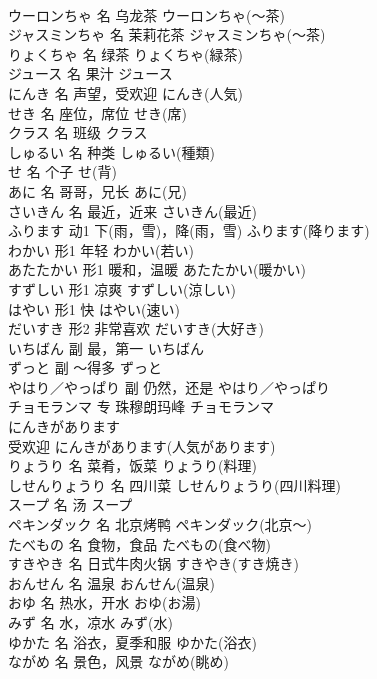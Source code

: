 \documentclass[8pt]{extreport}
\begin{document}
\begin{CJK}{UTF8}{min}
\\	ウーロンちゃ	名	乌龙茶	ウーロンちゃ(～茶)	
\\	ジャスミンちゃ	名	茉莉花茶	ジャスミンちゃ(～茶)	
\\	りょくちゃ	名	绿茶	りょくちゃ(緑茶)	
\\	ジュース	名	果汁	ジュース	
\\	にんき	名	声望，受欢迎	にんき(人気)	
\\	せき	名	座位，席位	せき(席)	
\\	クラス	名	班级	クラス	
\\	しゅるい	名	种类	しゅるい(種類)	
\\	せ	名	个子	せ(背)	
\\	あに	名	哥哥，兄长	あに(兄)	
\\	さいきん	名	最近，近来	さいきん(最近)	
\\	ふります	动1	下(雨，雪)，降(雨，雪)	ふります(降ります)	
\\	わかい	形1	年轻	わかい(若い)	
\\	あたたかい	形1	暖和，温暖	あたたかい(暖かい)	
\\	すずしい	形1	凉爽	すずしい(涼しい)	
\\	はやい	形1	快	はやい(速い)	
\\	だいすき	形2	非常喜欢	だいすき(大好き)	
\\	いちばん	副	最，第一	いちばん	
\\	ずっと	副	～得多	ずっと	
\\	やはり／やっぱり	副	仍然，还是	やはり／やっぱり	
\\	チョモランマ	专	珠穆朗玛峰	チョモランマ	
\\	にんきがあります	
\\	受欢迎	にんきがあります(人気があります)	
\\	りょうり	名	菜肴，饭菜	りょうり(料理)	
\\	しせんりょうり	名	四川菜	しせんりょうり(四川料理)	
\\	スープ	名	汤	スープ	
\\	ペキンダック	名	北京烤鸭	ペキンダック(北京～)	
\\	たべもの	名	食物，食品	たべもの(食べ物)	
\\	すきやき	名	日式牛肉火锅	すきやき(すき焼き)	
\\	おんせん	名	温泉	おんせん(温泉)	
\\	おゆ	名	热水，开水	おゆ(お湯)	
\\	みず	名	水，凉水	みず(水)	
\\	ゆかた	名	浴衣，夏季和服	ゆかた(浴衣)	
\\	ながめ	名	景色，风景	ながめ(眺め)	

\end{CJK}
\end{document}
